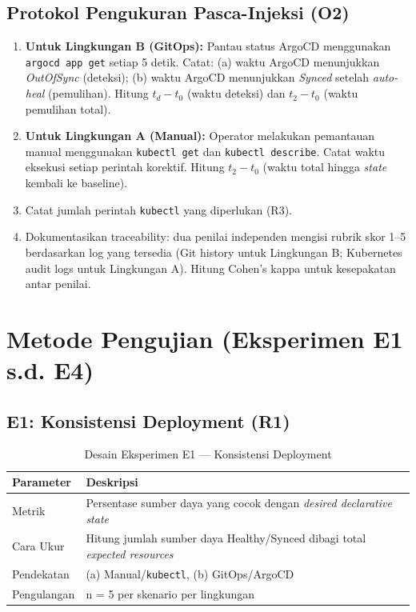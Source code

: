 \subsection{Protokol Pengukuran Pasca-Injeksi (O2)}
\begin{enumerate}
  \item \textbf{Untuk Lingkungan B (GitOps):} Pantau status ArgoCD menggunakan \texttt{argocd app get} setiap 5 detik. Catat: (a) waktu ArgoCD menunjukkan \textit{OutOfSync} (deteksi); (b) waktu ArgoCD menunjukkan \textit{Synced} setelah \textit{auto-heal} (pemulihan). Hitung $t_d - t_0$ (waktu deteksi) dan $t_2 - t_0$ (waktu pemulihan total).
  
  \item \textbf{Untuk Lingkungan A (Manual):} Operator melakukan pemantauan manual menggunakan \texttt{kubectl get} dan \texttt{kubectl describe}. Catat waktu eksekusi setiap perintah korektif. Hitung $t_2 - t_0$ (waktu total hingga \textit{state} kembali ke baseline).
  
  \item Catat jumlah perintah \texttt{kubectl} yang diperlukan (R3).
  
  \item Dokumentasikan traceability: dua penilai independen mengisi rubrik skor 1--5 berdasarkan log yang tersedia (Git history untuk Lingkungan B; Kubernetes audit logs untuk Lingkungan A). Hitung Cohen's kappa untuk kesepakatan antar penilai.
\end{enumerate}

\section{Metode Pengujian (Eksperimen E1 s.d. E4)}

\subsection{E1: Konsistensi Deployment (R1)}

\begin{table}[H]
  \centering
  \caption{Desain Eksperimen E1 --- Konsistensi Deployment}
  \label{tab:e1}
  \begin{tabular}{|l|p{9cm}|}
    \hline
    \textbf{Parameter} & \textbf{Deskripsi} \\
    \hline
    Metrik & Persentase sumber daya yang cocok dengan \textit{desired declarative state} \\
    \hline
    Cara Ukur & Hitung jumlah sumber daya Healthy/Synced dibagi total \textit{expected resources} \\
    \hline
    Pendekatan & (a) Manual/\texttt{kubectl}, (b) GitOps/ArgoCD \\
    \hline
    Pengulangan & n = 5 per skenario per lingkungan \\
    \hline
  \end{tabular}
\end{table}


